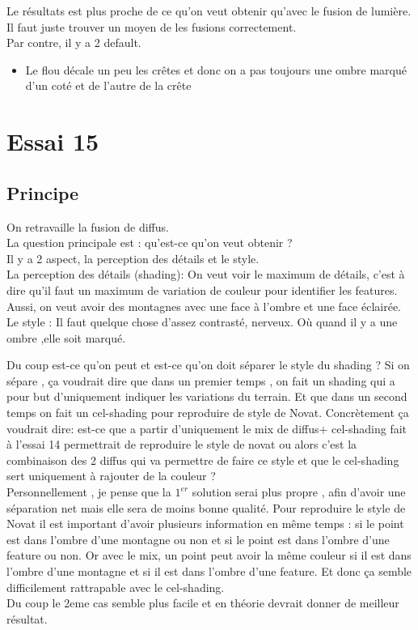 \documentclass[a4paper]{article}
\begin{document}
Le résultats est plus proche de ce qu'on veut obtenir qu'avec le fusion de lumière. Il faut juste trouver un moyen de les fusions correctement.\\
Par contre, il y a 2 default. 
\begin{itemize}
\item Le flou décale un peu les crêtes et donc on a pas toujours une ombre marqué d'un coté et de l'autre de la crête 
\end{itemize}



\section{Essai 15}

\subsection{Principe}

On retravaille la fusion de diffus.\\
La question principale est : qu'est-ce qu'on veut obtenir ? \\
Il y a 2 aspect, la perception des détails et le style. \\
La perception des détails (shading): On veut voir le maximum de détails, c'est à dire qu'il faut un maximum de variation de couleur pour identifier les features. Aussi, on veut avoir des montagnes avec une face à l'ombre et une face éclairée.\\ 
Le style : Il faut quelque chose d'assez contrasté, nerveux. Où quand il y a une ombre ,elle soit marqué.

Du coup est-ce qu'on peut et est-ce qu'on doit séparer le style du shading ?
Si on sépare , ça voudrait dire que dans un premier temps , on fait un shading qui a pour but d'uniquement indiquer les variations du terrain. Et que dans un second temps on fait un cel-shading pour reproduire de style de Novat. Concrètement ça voudrait dire: est-ce que a partir d'uniquement le mix de diffus+ cel-shading fait à l'essai 14 permettrait de reproduire le style de novat ou alors c'est la combinaison des 2 diffus qui va permettre de faire ce style et que le cel-shading sert uniquement à rajouter de la couleur ? \\

Personnellement , je pense que la $1^{er}$ solution serai plus propre , afin d'avoir une séparation net mais elle sera de moins bonne qualité. Pour reproduire le style de Novat il est important d'avoir plusieurs information en même temps : si le point est dans l'ombre d'une montagne ou non et si le point est dans l'ombre d'une feature ou non. Or avec le mix, un point peut avoir la même couleur si il est dans l'ombre d'une montagne et si il est dans l'ombre d'une feature. Et donc ça semble difficilement rattrapable avec le cel-shading.\\
Du coup le 2eme cas semble plus facile et en théorie devrait donner de meilleur résultat.\\
\end{document}
